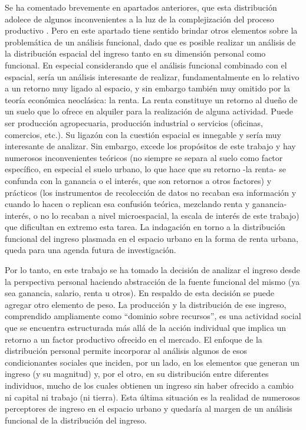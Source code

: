 	Se ha comentado brevemente en apartados anteriores, que esta distribución adolece de algunos inconvenientes a la luz de la complejización del proceso productivo \cite{altimir1986}. Pero en este apartado tiene sentido brindar otros elementos sobre la problemática de un análisis funcional, dado que es posible realizar un análisis de la distribución espacial del ingreso tanto en su dimensión personal como funcional. En especial considerando que el análisis funcional combinado con el espacial, sería un análisis interesante de realizar, fundamentalmente en lo relativo a un retorno muy ligado al espacio, y sin embargo también muy omitido por la teoría económica neoclásica: la renta. La renta constituye un retorno al dueño de un suelo que lo ofrece en alquiler para la realización de alguna actividad. Puede ser producción agropecuaria, producción industrial o servicios (oficinas, comercios, etc.). Su ligazón con la cuestión espacial es innegable y sería muy interesante de analizar. Sin embargo, excede los propósitos de este trabajo y hay numerosos inconvenientes teóricos (no siempre se separa al suelo como factor específico, en especial el suelo urbano, lo que hace que su retorno -la renta- se confunda con la ganancia o el interés, que son retornos a otros factores) y prácticos (los instrumentos de recolección de datos no recaban esa información y cuando lo hacen o replican esa confusión teórica, mezclando renta y ganancia-interés, o no lo recaban a nivel microespacial, la escala de interés de este trabajo) que dificultan en extremo esta tarea. La indagación en torno a la distribución funcional del ingreso  plasmada en el espacio urbano en la forma de renta urbana, queda para una agenda futura de investigación.
	
	Por lo tanto, en este trabajo se ha tomado la decisión de analizar el ingreso desde la perspectiva personal haciendo abstracción de la fuente funcional del mismo (ya sea ganancia, salario, renta u otros). En respaldo de esta decisión se puede agregar otro elemento de peso. La producción y la distribución de ese ingreso, comprendido ampliamente como “dominio sobre recursos”, es una actividad social que se encuentra estructurada más allá de la acción individual que implica un retorno a un factor productivo ofrecido en el mercado. El enfoque de la distribución personal permite incorporar al análisis algunos de esos condicionantes sociales que inciden, por un lado, en los elementos que generan un ingreso (y su magnitud) y, por el otro, en su distribución entre diferentes individuos, mucho de los cuales obtienen un ingreso sin haber ofrecido a cambio ni capital ni trabajo (ni tierra). Esta última situación es la realidad de numerosos perceptores de ingreso en el espacio urbano y quedaría al margen de un análisis funcional de la distribución del ingreso.
	
